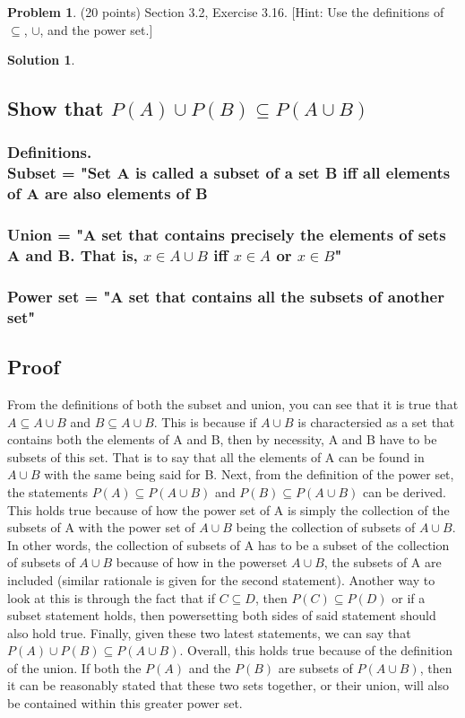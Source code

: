 \documentclass{article}
\theoremstyle{definition}
\newtheorem{problem}{Problem}
\newtheorem*{solution}{Solution}
\begin{document}
\newpage
\begin{problem} (20 points) Section 3.2, Exercise 3.16.
[Hint: Use the definitions of $\subseteq$, $\cup$, and the power set.]
\end{problem}
\begin{solution}
\hspace{1cm}
\subsection*{Show that $P(A) \cup P(B) \subseteq P(A \cup B)$}
\subsubsection*{Definitions. \\Subset = "Set A is called a subset of a set B iff all elements of A are also elements of B\\\\Union = "A set that contains precisely the elements of sets A and B. That is, $x \in A \cup B$ iff $x \in A$ or $x\in B$"\\\\Power set = "A set that contains all the subsets of another set"}
\subsection*{Proof}
From the definitions of both the subset and union, you can see that it is true that $A \subseteq A \cup B$ and $B \subseteq A \cup B$. This is because if $A \cup B$ is charactersied as a set that contains both the elements of A and B, then by necessity, A and B have to be subsets of this set. That is to say that all the elements of A can be found in $A \cup B$ with the same being said for B. Next, from the definition of the power set, the statements $P(A) \subseteq P(A \cup B)$ and $P(B) \subseteq P(A \cup B)$ can be derived. This holds true because of how the power set of A is simply the collection of the subsets of A with the power set of $A \cup B$ being the collection of subsets of $A \cup B$. In other words, the collection of subsets of A  has to be a subset of the collection of subsets of $A \cup B$ because of how in the powerset $A \cup B$, the subsets of A are included (similar rationale is given for the second statement). Another way to look at this is through the fact that if $C \subseteq D$, then $P(C) \subseteq P(D)$ or if a subset statement holds, then powersetting both sides of said statement should also hold true. Finally, given these two latest statements, we can say that $P(A) \cup P(B) \subseteq P(A \cup B)$. Overall, this holds true because of the definition of the union. If both the $P(A)$ and the $P(B)$ are subsets of $P(A \cup B)$, then it can be reasonably stated that these two sets together, or their union, will also be contained within this greater power set.
\end{solution}
\end{document}
